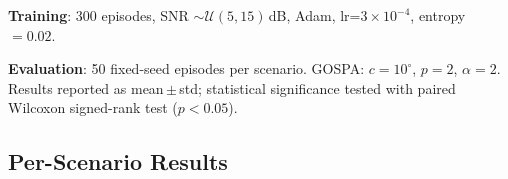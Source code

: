 \documentclass[journal]{IEEEtran}
\begin{document}
\textbf{Training}: 300 episodes, SNR $\sim \mathcal{U}(5,15)$\,dB,
Adam, lr=$3{\times}10^{-4}$, entropy $= 0.02$.

\textbf{Evaluation}: 50 fixed-seed episodes per scenario.
GOSPA: $c{=}10^\circ$, $p{=}2$, $\alpha{=}2$.
Results reported as mean\,$\pm$\,std; statistical significance
tested with paired Wilcoxon signed-rank test ($p{<}0.05$).

\subsection{Per-Scenario Results}

\begin{table}[t]
  \centering
  \caption{GOSPA per scenario (mean\,$\pm$\,std, $\downarrow$, 50 seeds).
           $\dagger$: significant vs.\ MLP-PPO ($p{<}0.05$, Wilcoxon).
           \textbf{Bold} = best.}
  \label{tab:results}
\end{table}
\end{document}
